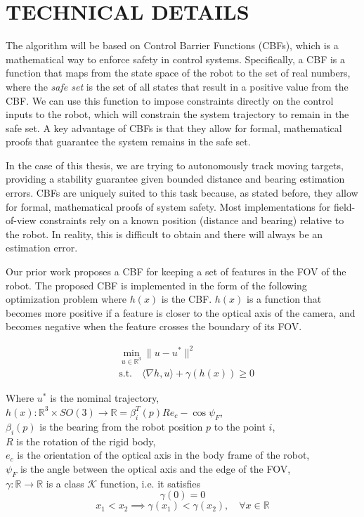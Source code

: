 \documentclass[letterpaper, 10 pt, conference]{ieeeconf}
\begin{document}
\section{TECHNICAL DETAILS}

The algorithm will be based on Control Barrier Functions (CBFs), which is a mathematical way to enforce safety in control systems. Specifically, a CBF is a function that maps from the state space of the robot to the set of real numbers, where the \textit{safe set} is the set of all states that result in a positive value from the CBF. We can use this function to impose constraints directly on the control inputs to the robot, which will constrain the system trajectory to remain in the safe set. A key advantage of CBFs is that they allow for formal, mathematical proofs that guarantee the system remains in the safe set.

In the case of this thesis, we are trying to autonomously track moving targets, providing a stability guarantee given bounded distance and bearing estimation errors. CBFs are uniquely suited to this task because, as stated before, they allow for formal, mathematical proofs of system safety. Most implementations for field-of-view constraints rely on a known position (distance and bearing) relative to the robot. In reality, this is difficult to obtain and there will always be an estimation error.

Our prior work \cite{tron_paper} proposes a CBF for keeping a set of features in the FOV of the robot. The proposed CBF is implemented in the form of the following optimization problem where $h(x)$ is the CBF. $h(x)$ is a function that becomes more positive if a feature is closer to the optical axis of the camera, and becomes negative when the feature crosses the boundary of its FOV.

\begin{equation} \label{qp}
\begin{aligned}
    & \min_{u \in \mathbb{R}^3} \|u - u^*\|^2 \\
    & \text{s.t.} \quad \langle \nabla h, u \rangle + \gamma(h(x)) \geq 0
\end{aligned}
\end{equation}

Where $u^*$ is the nominal trajectory, \\
$h(x): \mathbb{R}^3 \times SO(3) \to \mathbb{R} = \beta_i^T(p) R e_c - \cos \psi_F$, \\
$\beta_i(p)$ is the bearing from the robot position $p$ to the point $i$, \\
$R$ is the rotation of the rigid body, \\
$e_c$ is the orientation of the optical axis in the body frame of the robot, \\
$\psi_F$ is the angle between the optical axis and the edge of the FOV, \\
$\gamma: \mathbb{R} \to \mathbb{R}$ is a class $\mathcal{K}$ function, i.e. it satisfies
\[
\gamma(0) = 0
\]
\[
x_1 < x_2 \implies \gamma(x_1) < \gamma(x_2), \quad \forall x \in \mathbb{R}
\]
\end{document}
